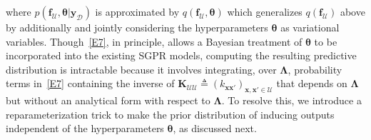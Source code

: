 \documentclass[conference]{IEEEtran}
\begin{document}
	where 
	$p(\mathbf{f}_\mathcal{U}, \boldsymbol{\theta} | \mathbf{y}_\mathcal{D})$ is approximated by $q(\mathbf{f}_\mathcal{U},\boldsymbol{\theta})$ which generalizes $q(\mathbf{f}_\mathcal{U})$ above
by additionally and jointly considering the hyperparameters $\boldsymbol{\theta}$ as variational variables.
	Though~\eqref{E7}, in principle, allows a Bayesian treatment of $\boldsymbol{\theta}$ to be incorporated into the existing SGPR models, computing the resulting predictive distribution is intractable because
	it involves integrating, over $\boldsymbol{\Lambda}$,
	probability terms in~\eqref{E7} containing the inverse of $\mathbf{K}_\mathcal{UU} \triangleq (k_{\mathbf{x}\mathbf{x}'})_{\mathbf{x},\mathbf{x}'\in\mathcal{U}}$ that depends on $\boldsymbol{\Lambda}$ but without an analytical form with respect to $\boldsymbol{\Lambda}$. %
%
	To resolve this, we introduce a reparameterization trick	
to make the prior distribution of inducing outputs independent of the hyperparameters $\boldsymbol{\theta}$, as discussed next. %

\end{document}
